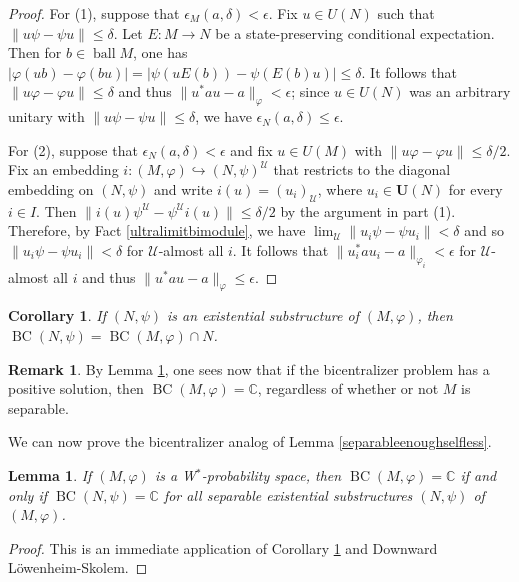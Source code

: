 \documentclass[12pt]{amsart}
\newtheorem{lem}[thm]{Lemma}
\newtheorem{cor}[thm]{Corollary}
\theoremstyle{definition}
\newtheorem{remark}[thm]{Remark}
\newcommand{\C}{\mathbb{C}}
\def\bb{\mathbb}
\def\bb{\mathbb}
\def\u{\mathsf 1}
\def \u{\mathcal U}
\def\BC{\operatorname{BC}}
\begin{document}
\begin{proof}
For (1), suppose that $\epsilon_M(a,\delta)<\epsilon$.  Fix $u\in U(N)$ such that $\|u\psi-\psi u\|\leq \delta$.  Let $E:M\to N$ be a state-preserving conditional expectation.  Then for $b\in \operatorname{ball} M$, one has $|\varphi(ub)-\varphi(bu)|=|\psi(uE(b))-\psi(E(b)u)|\leq \delta$.  It follows that $\|u\varphi-\varphi u\|\leq \delta$ and thus $\|u^*au-a\|_\varphi<\epsilon$; since $u\in U(N)$ was an arbitrary unitary with $\|u\psi-\psi u\|\leq \delta$, we have $\epsilon_N(a,\delta)\leq \epsilon$.

For (2), suppose that $\epsilon_N(a,\delta)<\epsilon$ and fix $u\in U(M)$ with $\|u\varphi-\varphi u\|\leq \delta/2$.  Fix an embedding $i:(M,\varphi)\hookrightarrow (N,\psi)^\u$ that restricts to the diagonal embedding on $(N,\psi)$ and write $i(u)=(u_i)_\u$, where $u_i\in \mathbf{U}(N)$ for every $i\in I$.  Then $\|i(u)\psi^\u-\psi^\u i(u)\|\leq \delta/2$ by the argument in part (1).  Therefore, by Fact \ref{ultralimitbimodule}, we have $\lim_\u \|u_i\psi-\psi u_i\|<\delta$ and so $\|u_i\psi-\psi u_i\|<\delta$ for $\u$-almost all $i$.  It follows that $\|u_i^*au_i-a\|_{\varphi_i}<\epsilon$ for $\u$-almost all $i$ and thus $\|u^*au-a\|_\varphi\leq \epsilon$.
\end{proof}

\begin{cor}\label{BCpreceq}
If $(N,\psi)$ is an existential substructure of $(M,\varphi)$, then $\BC(N,\psi)=\BC(M,\varphi)\cap N$.
\end{cor}

\begin{remark}\label{rem separableunnecessary}
By Lemma \ref{BCpreceq}, one sees now that if the bicentralizer problem has a positive solution, then $\BC(M,\varphi)=\bb C$, regardless of whether or not $M$ is separable.
\end{remark}

We can now prove the bicentralizer analog of Lemma \ref{separableenoughselfless}.
\begin{lem}\label{separableenoughbicentralizer}
If $(M,\varphi)$ is a W$^*$-probability space, then $\BC(M,\varphi)=\mathbb C$ if and only if $\BC(N,\psi)=\C$ for all separable existential substructures $(N,\psi)$ of $(M,\varphi)$.
\end{lem}

\begin{proof}
This is an immediate application of Corollary \ref{BCpreceq} and Downward L\"owenheim-Skolem.
\end{proof}
\end{document}
